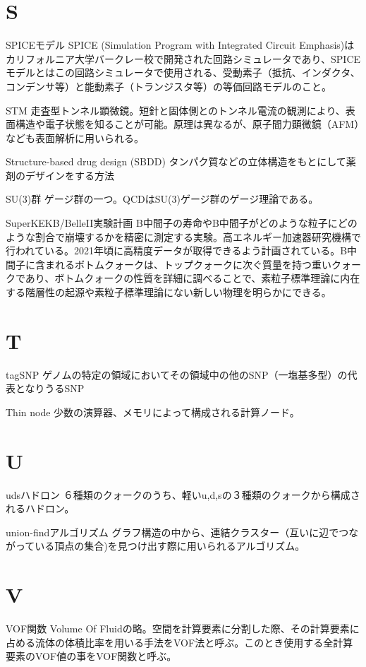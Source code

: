 \begin{用語集}
\section{S}
\item{SPICEモデル}{}
{SPICE (Simulation Program with Integrated Circuit Emphasis)はカリフォルニア大学バークレー校で開発された回路シミュレータであり、SPICEモデルとはこの回路シミュレータで使用される、受動素子（抵抗、インダクタ、コンデンサ等）と能動素子（トランジスタ等）の等価回路モデルのこと。}
\item{STM}{}
{走査型トンネル顕微鏡。短針と固体側とのトンネル電流の観測により、表面構造や電子状態を知ることが可能。原理は異なるが、原子間力顕微鏡（AFM）なども表面解析に用いられる。}
\item{Structure-based drug design (SBDD)}{}
{タンパク質などの立体構造をもとにして薬剤のデザインをする方法}
\item{SU(3)群}{}
{ゲージ群の一つ。QCDはSU(3)ゲージ群のゲージ理論である。}
\item{SuperKEKB/BelleII実験計画}{}
{B中間子の寿命やB中間子がどのような粒子にどのような割合で崩壊するかを精密に測定する実験。高エネルギー加速器研究機構で行われている。2021年頃に高精度データが取得できるよう計画されている。B中間子に含まれるボトムクォークは、トップクォークに次ぐ質量を持つ重いクォークであり、ボトムクォークの性質を詳細に調べることで、素粒子標準理論に内在する階層性の起源や素粒子標準理論にない新しい物理を明らかにできる。}
\section{T}
\item{tagSNP}{}
{ゲノムの特定の領域においてその領域中の他のSNP（一塩基多型）の代表となりうるSNP}
\item{Thin node}{}
{少数の演算器、メモリによって構成される計算ノード。}
\section{U}
\item{udsハドロン}{}
{６種類のクォークのうち、軽いu,d,sの３種類のクォークから構成されるハドロン。}
\item{union-findアルゴリズム}{}
{グラフ構造の中から、連結クラスター（互いに辺でつながっている頂点の集合)を見つけ出す際に用いられるアルゴリズム。}
\section{V}
\item{VOF関数}{}
{Volume Of Fluidの略。空間を計算要素に分割した際、その計算要素に占める流体の体積比率を用いる手法をVOF法と呼ぶ。このとき使用する全計算要素のVOF値の事をVOF関数と呼ぶ。}

\end{用語集}
